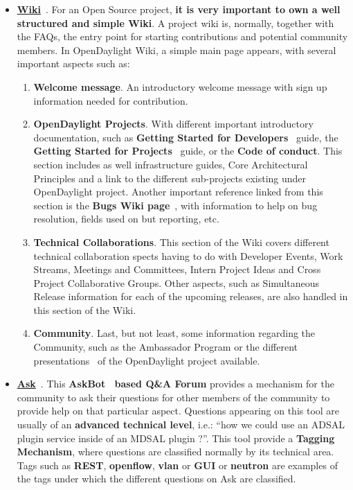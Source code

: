 \documentclass[a4paper, 12pt]{book}
\begin{document}
\begin{itemize}\itemsep0pt
\item{\textbf{\underline{Wiki}}}~\cite{OpenDaylightWiki}. For an Open Source project, \textbf{it is very important to own a well structured and simple Wiki}. A project wiki is, normally, together with the FAQs, the entry point for starting contributions and potential community members. In OpenDaylight Wiki, a simple main page appears, with several important aspects such as:
\begin{enumerate}\itemsep0pt
\item{\textbf{Welcome message}}. An introductory welcome message with sign up information needed for contribution.
\item{\textbf{OpenDaylight Projects}}. With different important introductory documentation, such as \textbf{Getting Started for Developers}~\cite{OpenDaylightDevStGuide} guide, the \textbf{Getting Started for Projects}~\cite{OpenDaylightProjStGuide} guide, or the \textbf{Code of conduct}. This section includes as well infrastructure guides, Core Architectural Principles and a link to the different sub-projects existing under OpenDaylight project.  Another important reference linked from this section is the \textbf{Bugs Wiki page}~\cite{OpenDaylightBugsWiki}, with information to help on bug resolution, fields used on but reporting, etc.
\item{\textbf{Technical Collaborations}}. This section of the Wiki covers different technical collaboration spects having to do with Developer Events, Work Streams, Meetings and Committees, Intern Project Ideas and Cross Project Collaborative Groups. Other aspects, such as Simultaneous Release information for each of the upcoming releases, are also handled in this section of the Wiki.
\item{\textbf{Community}}. Last, but not least, some information regarding the Community, such as the Ambassador Program or the different presentations~\cite{OpenDaylightPresentations} of the OpenDaylight project available.
\end{enumerate}
\item{\textbf{\underline{Ask}}}~\cite{OpenDaylightAsk}. This \textbf{AskBot~\cite{AskBot} based Q\&A Forum} provides a mechanism for the community to ask their questions for other members of the community to provide help on that particular aspect. Questions appearing on this tool are usually of an \textbf{advanced technical level}, i.e.: ``how we could use an ADSAL plugin service inside of an MDSAL plugin ?''. This tool provide a \textbf{Tagging Mechanism}, where questions are classified normally by its technical area. Tags such as \textbf{REST}, \textbf{openflow}, \textbf{vlan} or \textbf{GUI} or \textbf{neutron} are examples of the tags under which the different questions on Ask are classified.

\end{itemize}
\end{document}
